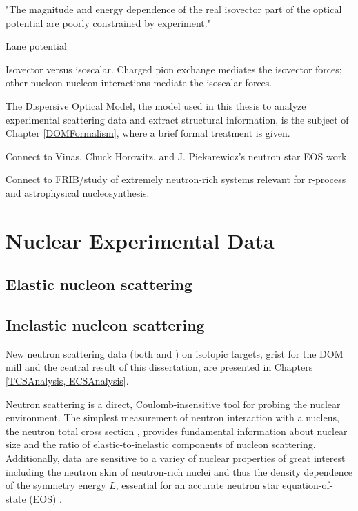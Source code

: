 "The magnitude and energy dependence of the real isovector part of the
optical potential are poorly constrained by experiment." \cite{Holt16}

Lane potential 

Isovector versus isoscalar. Charged pion exchange mediates the isovector forces;
other nucleon-nucleon interactions mediate the isoscalar forces.

The Dispersive Optical Model, the model used in this thesis to analyze experimental scattering data
and extract structural information, is the subject of Chapter \ref{DOMFormalism}, where a brief
formal treatment is given.

Connect to Vinas, Chuck Horowitz, and J. Piekarewicz's neutron star EOS work.

Connect to FRIB/study of extremely neutron-rich systems relevant for r-process
and astrophysical nucleosynthesis.

\section{Nuclear Experimental Data}
\subsection{Elastic nucleon scattering}
\subsection{Inelastic nucleon scattering}

New neutron scattering data (both \tot and \el) on isotopic targets, grist for the DOM mill and the 
central result of this dissertation, are presented in Chapters \ref{TCSAnalysis, ECSAnalysis}.

Neutron scattering is a direct, Coulomb-insensitive tool for probing the nuclear
environment. The simplest measurement of neutron interaction with a nucleus,
the neutron total cross section \totE, provides fundamental information about
nuclear size and the ratio of elastic-to-inelastic components of nucleon 
scattering. Additionally, \tots data are sensitive to a variey of nuclear
properties of great interest including the neutron skin of neutron-rich nuclei
\cite{Mahzoon2017} and thus the density dependence of the symmetry energy $L$,
essential for an accurate neutron star equation-of-state (EOS)
\cite{Fattoyev2012, Vinas2014, Brown2000}.

